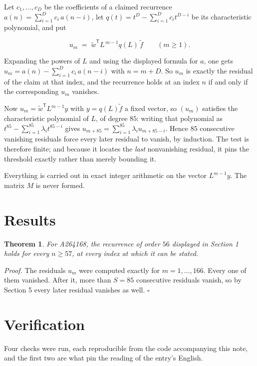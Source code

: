 \documentclass[11pt]{article}
\newtheorem{theorem}{Theorem}
\theoremstyle{definition}
\begin{document}
Let $c_1,\dots,c_D$ be the coefficients of a claimed recurrence $a(n) = \sum_{i=1}^{D} c_i\,a(n-i)$, let $q(t) = t^{D} - \sum_{i=1}^{D} c_i t^{D-i}$ be its characteristic polynomial, and put

\[u_m \;=\; \tilde w^{\mathsf T} L^{\,m-1} q(L)\,\tilde f \qquad (m \ge 1).\]

Expanding the powers of $L$ and using the displayed formula for $a$, one gets $u_m = a(n) - \sum_{i=1}^{D} c_i\,a(n-i)$ with $n = m + D$. So $u_m$ is exactly the residual of the claim at that index, and the recurrence holds at an index $n$ if and only if the corresponding $u_m$ vanishes.

Now $u_m = \tilde w^{\mathsf T} L^{m-1} y$ with $y = q(L)\tilde f$ a fixed vector, so $(u_m)$ satisfies the characteristic polynomial of $L$, of degree $85$: writing that polynomial as $t^{85} - \sum_{i=1}^{85} \lambda_i t^{85-i}$ gives $u_{m+85} = \sum_{i=1}^{85} \lambda_i u_{m+85-i}$. Hence $85$ consecutive vanishing residuals force every later residual to vanish, by induction. The test is therefore finite; and because it locates the {\itshape last} nonvanishing residual, it pins the threshold exactly rather than merely bounding it.

Everything is carried out in exact integer arithmetic on the vector $L^{m-1}y$. The matrix $M$ is never formed.

\section{Results}

\begin{theorem} For A264168, the recurrence of order $56$ displayed in Section 1 holds for every $n \ge 57$, at every index at which it can be stated.\end{theorem}

{\itshape Proof.} The residuals $u_m$ were computed exactly for $m = 1,\dots,166$. Every one of them vanished. After it, more than $S = 85$ consecutive residuals vanish, so by Section 5 every later residual vanishes as well. $\square$

\section{Verification}

Four checks were run, each reproducible from the code accompanying this note, and the first two are what pin the reading of the entry's English.
\end{document}
